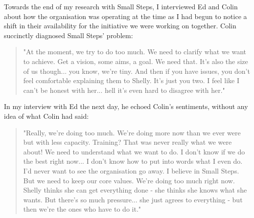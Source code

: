 Towards the end of my research with Small Steps, I interviewed Ed and Colin about how the organisation was operating at the time as I had begun to notice a shift in their availability for the initiative we were working on together. Colin succinctly diagnosed Small Steps’ problem:
\begin{quote}
"At the moment, we try to do too much. We need to clarify what we want to achieve. Get a vision, some aims, a goal. We need that. It's also the size of us though... you know, we're tiny. And then if you have issues, you don't feel comfortable explaining them to Shelly. It's just you two. I feel like I can't be honest with her... hell it's even hard to disagree with her."
\end{quote}
In my interview with Ed the next day, he echoed Colin’s sentiments, without any idea of what Colin had said:
\begin{quote}
"Really, we're doing too much. We're doing more now than we ever were but with less capacity. Training? That was never really what we were about! We need to understand what we want to do. I don't know if we do the best right now... I don't know how to put into words what I even do. I'd never want to see the organisation go away. I believe in Small Steps. But we need to keep our core values. We're doing too much right now. Shelly thinks she can get everything done - she thinks she knows what she wants. But there's so much pressure... she just agrees to everything - but then we're the ones who have to do it."
\end{quote}
